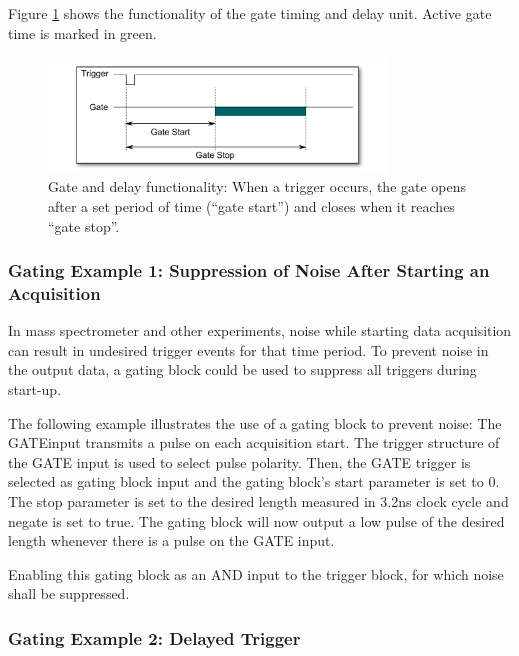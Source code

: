 		Figure \ref{fig:GateUDelay} shows the functionality of the gate timing and delay unit. Active gate time is marked in green.
		
		\begin{figure}[ht]
			\begin{center}
				\includegraphics[width=0.8\textwidth]{figures/GateUDelay.pdf}
				\caption{\label{fig:GateUDelay} Gate and delay functionality: When a trigger occurs, the gate opens after a set period of time (``gate start'') and closes when it reaches ``gate stop''.}
			\end{center}
		\end{figure}
		
		\subsubsection{Gating Example 1: Suppression of Noise After Starting an Acquisition}
			
			In mass spectrometer and other experiments, noise while starting data acquisition can result in undesired trigger events for that time period. To prevent noise in the output data, a gating block could be used to suppress all triggers during start-up.\par
			
			The following example illustrates the use of a gating block to prevent noise: The GATEinput transmits a pulse on each acquisition start. The trigger structure of the GATE input is used to select pulse polarity. Then, the GATE trigger is selected as gating block input and the gating block's start parameter is set to 0. The stop parameter is set to the desired length measured in 3.2ns clock cycle and negate is set to true. The gating block will now output a low pulse of the desired length whenever there is a pulse on the GATE input.\par
			
		Enabling this gating block as an AND input to the trigger block, for which noise shall be suppressed.
			
		\subsubsection{Gating Example 2: Delayed Trigger}
		
